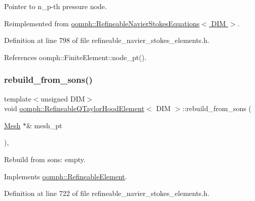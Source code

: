 Pointer to n\+\_\+p-\/th pressure node. 



Reimplemented from \hyperlink{classoomph_1_1RefineableNavierStokesEquations_acf35b4945a4b528f1b4eddfd6ca0c3d7}{oomph\+::\+Refineable\+Navier\+Stokes\+Equations$<$ D\+I\+M $>$}.



Definition at line 798 of file refineable\+\_\+navier\+\_\+stokes\+\_\+elements.\+h.



References oomph\+::\+Finite\+Element\+::node\+\_\+pt().

\mbox{\label{classoomph_1_1RefineableQTaylorHoodElement_a207d8ad472735c629b01be6318aed44d}} 
\subsubsection{\texorpdfstring{rebuild\+\_\+from\+\_\+sons()}{rebuild\_from\_sons()}}
{\footnotesize\ttfamily template$<$unsigned D\+IM$>$ \\
void \hyperlink{classoomph_1_1RefineableQTaylorHoodElement}{oomph\+::\+Refineable\+Q\+Taylor\+Hood\+Element}$<$ D\+IM $>$\+::rebuild\+\_\+from\+\_\+sons (\begin{DoxyParamCaption}\item[{\hyperlink{classoomph_1_1Mesh}{Mesh} $\ast$\&}]{mesh\+\_\+pt }\end{DoxyParamCaption})\hspace{0.3cm}{\ttfamily [inline]}, {\ttfamily [virtual]}}



Rebuild from sons\+: empty. 



Implements \hyperlink{classoomph_1_1RefineableElement_a33324be27833fa4b78279d17158215fa}{oomph\+::\+Refineable\+Element}.



Definition at line 722 of file refineable\+\_\+navier\+\_\+stokes\+\_\+elements.\+h.

\mbox{\label{classoomph_1_1RefineableQTaylorHoodElement_a4b6f46aea58a70a24f9c356074a0ad95}} 
